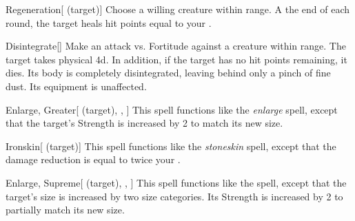 \lowercase{\hypertarget{spell:Regeneration}{}}\label{spell:Regeneration}
\begin{attuneability}[\nth{4}]{\hypertarget{spell:Regeneration}{Regeneration}}[ (target)]
Choose a willing creature within \rngclose range.
A the end of each round, the target heals hit points equal to your .
\end{attuneability}
\vspace{0.25em}



\lowercase{\hypertarget{spell:Disintegrate}{}}\label{spell:Disintegrate}
\begin{apability}[\nth{5}]{\hypertarget{spell:Disintegrate}{Disintegrate}}[]
Make an attack vs. Fortitude against a creature within \rngmed range.
\hit The target takes physical  \plus4d.
In addition, if the target has no hit points remaining, it dies.
Its body is completely disintegrated, leaving behind only a pinch of fine dust.
Its equipment is unaffected.
\end{apability}
\vspace{0.25em}



\lowercase{\hypertarget{spell:Enlarge, Greater}{}}\label{spell:Enlarge, Greater}
\begin{attuneability}[\nth{5}]{\hypertarget{spell:Enlarge, Greater}{Enlarge, Greater}}[ (target), , ]
This spell functions like the \textit{enlarge} spell, except that the target's Strength is increased by 2 to match its new size.
\end{attuneability}
\vspace{0.25em}



\lowercase{\hypertarget{spell:Ironskin}{}}\label{spell:Ironskin}
\begin{attuneability}[\nth{6}]{\hypertarget{spell:Ironskin}{Ironskin}}[ (target)]
This spell functions like the \textit{stoneskin} spell, except that the damage reduction is equal to twice your .
\end{attuneability}
\vspace{0.25em}



\lowercase{\hypertarget{spell:Enlarge, Supreme}{}}\label{spell:Enlarge, Supreme}
\begin{attuneability}[\nth{7}]{\hypertarget{spell:Enlarge, Supreme}{Enlarge, Supreme}}[ (target), , ]
This spell functions like the  spell, except that the target's size is increased by two size categories.
Its Strength is increased by 2 to partially match its new size.
\end{attuneability}
\vspace{0.25em}



